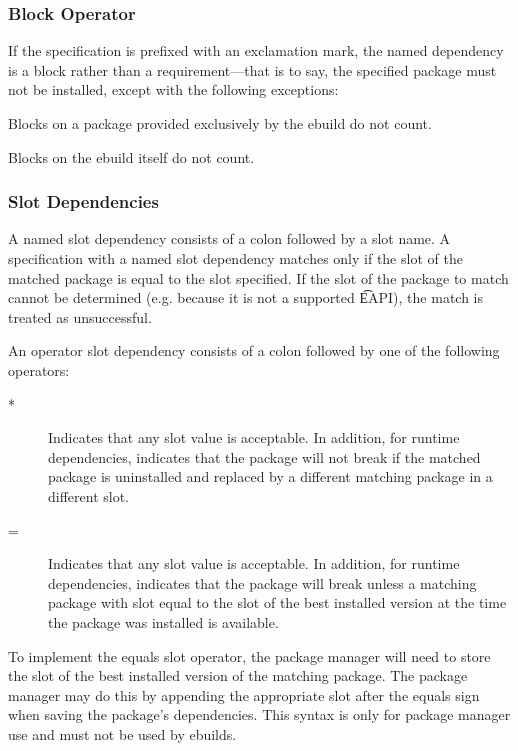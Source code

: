 \subsubsection{Block Operator}

If the specification is prefixed with an exclamation mark, the named dependency is a block rather
than a requirement---that is to say, the specified package must not be installed, except with the
following exceptions:

\begin{compactitem}
\item Blocks on a package provided exclusively by the ebuild do not count. \label{provided-blocks}
\item Blocks on the ebuild itself do not count.
\end{compactitem}

\subsubsection{Slot Dependencies}
\label{slot-dep}

A named slot dependency consists of a colon followed by a slot name. A specification with a named
slot dependency matches only if the slot of the matched package is equal to the slot specified. If
the slot of the package to match cannot be determined (e.g. because it is not a supported \t{EAPI}),
the match is treated as unsuccessful.

\IFKDEBUILDELSE
{
    An operator slot dependency consists of a colon followed by one of the following operators:

    \begin{description}
    \item[*] Indicates that any slot value is acceptable. In addition, for runtime dependencies,
    indicates that the package will not break if the matched package is uninstalled and replaced by
    a different matching package in a different slot.
    \item[=] Indicates that any slot value is acceptable. In addition, for runtime dependencies,
    indicates that the package will break unless a matching package with slot equal to the slot of
    the best installed version at the time the package was installed is available.
    \end{description}

    To implement the equals slot operator, the package manager will need to store the slot of the
    best installed version of the matching package. The package manager may do this by appending
    the appropriate slot after the equals sign when saving the package's dependencies. This syntax
    is only for package manager use and must not be used by ebuilds.
}{
}

